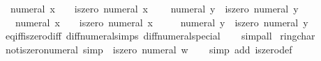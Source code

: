 \begin{isabellebody}
\ \ {\isachardoublequoteopen}numeral\ x\ {\isacharequal}{\kern0pt}\ {}\ {\isasymlongleftrightarrow}\ iszero\ {\isacharparenleft}{\kern0pt}numeral\ x{\isacharparenright}{\kern0pt}{\isachardoublequoteclose}\isanewline
\ \ {\isachardoublequoteopen}{}\ {\isacharequal}{\kern0pt}\ numeral\ y\ {\isasymlongleftrightarrow}\ iszero\ {\isacharparenleft}{\kern0pt}numeral\ y{\isacharparenright}{\kern0pt}{\isachardoublequoteclose}\isanewline
\ \ {\isachardoublequoteopen}{\isacharminus}{\kern0pt}\ numeral\ x\ {\isacharequal}{\kern0pt}\ {}\ {\isasymlongleftrightarrow}\ iszero\ {\isacharparenleft}{\kern0pt}numeral\ x{\isacharparenright}{\kern0pt}{\isachardoublequoteclose}\isanewline
\ \ {\isachardoublequoteopen}{}\ {\isacharequal}{\kern0pt}\ {\isacharminus}{\kern0pt}\ numeral\ y\ {\isasymlongleftrightarrow}\ iszero\ {\isacharparenleft}{\kern0pt}numeral\ y{\isacharparenright}{\kern0pt}{\isachardoublequoteclose}\isanewline
%
\isadelimproof
\ \ %
\endisadelimproof
%
\isatagproof
{}\isamarkupfalse%
\ eq{\isacharunderscore}{\kern0pt}iff{\isacharunderscore}{\kern0pt}iszero{\isacharunderscore}{\kern0pt}diff\ diff{\isacharunderscore}{\kern0pt}numeral{\isacharunderscore}{\kern0pt}simps\ diff{\isacharunderscore}{\kern0pt}numeral{\isacharunderscore}{\kern0pt}special\isanewline
\ \ \isamarkupfalse%
\ simp{\isacharunderscore}{\kern0pt}all%
\endisatagproof
{\isafoldproof}%
%
\isadelimproof
\isanewline
%
\endisadelimproof
\isanewline
{}\isamarkupfalse%
%
\isadelimdocument
%
\endisadelimdocument
%
\isatagdocument
%
\isamarkuptrue%
%
\endisatagdocument
{\isafolddocument}%
%
\isadelimdocument
%
\endisadelimdocument
{}\isamarkupfalse%
\ ring{\isacharunderscore}{\kern0pt}char{\isacharunderscore}{\kern0pt}{}\isanewline
{}\isanewline
\isanewline
{}\isamarkupfalse%
\ not{\isacharunderscore}{\kern0pt}iszero{\isacharunderscore}{\kern0pt}numeral\ {\isacharbrackleft}{\kern0pt}simp{\isacharbrackright}{\kern0pt}{\isacharcolon}{\kern0pt}\ {\isachardoublequoteopen}{\isasymnot}\ iszero\ {\isacharparenleft}{\kern0pt}numeral\ w{\isacharparenright}{\kern0pt}{\isachardoublequoteclose}\isanewline
%
\isadelimproof
\ \ %
\endisadelimproof
%
\isatagproof
{}\isamarkupfalse%
\ {\isacharparenleft}{\kern0pt}simp\ add{\isacharcolon}{\kern0pt}\ iszero{\isacharunderscore}{\kern0pt}def{\isacharparenright}{\kern0pt}%

\end{isabellebody}
